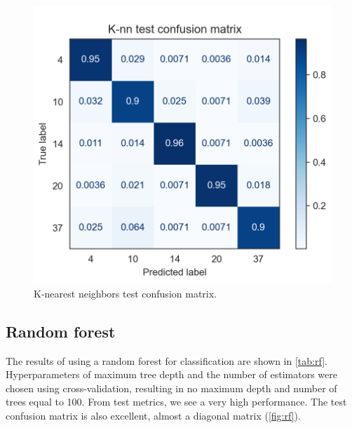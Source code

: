 \documentclass[twocolumn]{article}
\begin{document}
                  \begin{figure}[H]
                        \includegraphics[width=\linewidth]{k_nn.png}
                        \caption{K-nearest neighbors test confusion matrix.}
                        \label{fig:k_nn}
                  \end{figure}

            \subsection{Random forest}

                  The results of using a random forest for classification are shown in \autoref{tab:rf}. Hyperparameters of maximum tree depth and the number of estimators were chosen using cross-validation, resulting in no maximum depth and number of trees equal to 100. From test metrics, we see a very high performance. The test confusion matrix is also excellent, almost a diagonal matrix (\autoref{fig:rf}).
                  
\end{document}
